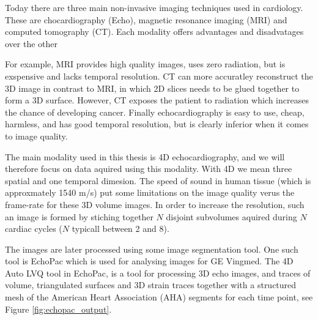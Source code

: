Today there are three main non-invasive imaging techniques used in
cardiology. These are chocardiography (Echo), magnetic
resonance imaging (MRI) and computed tomography (CT). Each
modality offers advantages and disadvatages over the other

For example, MRI provides
high quality images, uses zero radiation, but is exspensive and lacks
temporal resolution. CT can more accuratley reconstruct the 3D image
in contrast to MRI, in which 2D slices needs to be glued together to
form a 3D surface. However, CT exposes the patient to radiation which
increases the chance of developing cancer. Finally echocardiography is
easy to use, cheap, harmless, and  has good temporal resolution, but
is clearly inferior when it comes to image quality. 


The main modality used in this thesis is 4D echocardiography, and we
will therefore focus on data aquired using this modality.
With 4D we mean three spatial and one temporal dimesion.
The speed of sound in human tissue (which is approxmately 1540 m/s)
put some limitations on the image quality verus the frame-rate
\cite{rabben2010technical} for these 3D volume images. In order to
increase the resolution, such an image is formed by stiching together
$N$ disjoint subvolumes aquired during $N$ cardiac cycles ($N$
typicall between 2 and 8)\cite{brekke2007volume}. 

The images are later processed using some image segmentation tool.
One such tool is EchoPac which is used for analysing images for GE
Vingmed. The 4D Auto LVQ tool in EchoPac, is a tool for processing 3D
echo images, and traces of volume, triangulated surfaces and 3D strain
\cite{heimdal20114d} traces together with a structured mesh of the
American Heart Association (AHA) segments
\cite{cerqueira2002standardized} for each time point, see Figure
\ref{fig:echopac_output}. 

